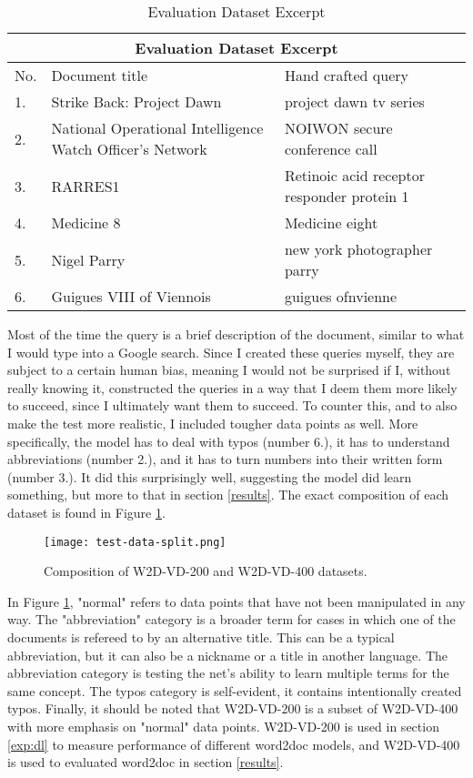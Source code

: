 \begin{table}
  \centering
  \begin{tabular}{|p{1cm}|p{6cm}|p{6cm}|}
    \hline
    \multicolumn{3}{|c|}{Evaluation Dataset Excerpt} \\
    \hline
    No.&Document title&Hand crafted query\\
    \hline
    \hline
    1.&Strike Back: Project Dawn&project dawn tv series\\
    2.&National Operational Intelligence Watch Officer's Network&NOIWON secure conference call\\
    3.&RARRES1&Retinoic acid receptor responder protein 1\\
    4.&Medicine 8&Medicine eight\\
    5.&Nigel Parry&new york photographer parry\\
    6.&Guigues VIII of Viennois&guigues ofnvienne\\
    \hline
  \end{tabular}
  \caption{Evaluation Dataset Excerpt}
  \label{tbl:eval-data}
\end{table}

Most of the time the query is a brief description of the document, similar to what I would type into a Google search. Since I
created these queries myself, they are subject to a certain human bias, meaning I would not be surprised if I, without really
knowing it, constructed the queries in a way that I deem them more likely to succeed, since I ultimately want them to succeed. To
counter this, and to also make the test more realistic, I included tougher data points as well. More specifically, the
model has to deal with typos (number 6.), it has to understand abbreviations (number 2.), and it has to turn numbers into their written
form (number 3.). It did this surprisingly well, suggesting the model did learn something, but more to that in section
\ref{results}. The exact composition of each dataset is found in Figure \ref{fig:dataset-comp}.

\begin{figure}
  \begin{center}
    \texttt{[image: test-data-split.png]}
  \end{center}
  \caption{Composition of W2D-VD-200 and W2D-VD-400 datasets.}
  \label{fig:dataset-comp}
\end{figure}

In Figure \ref{fig:dataset-comp}, "normal" refers to data points that have not been manipulated in any way. The "abbreviation"
category is a broader term for cases in which one of the documents is refereed to by an alternative title. This can be a typical
abbreviation, but it can also be a nickname or a title in another language. The abbreviation category is testing the net's ability
to learn multiple terms for the same concept. The typos category is self-evident, it contains intentionally created typos. Finally,
it should be noted that W2D-VD-200 is a subset of W2D-VD-400 with more emphasis on "normal" data points. W2D-VD-200 is used in
section \ref{exp:dl} to measure performance of different word2doc models, and W2D-VD-400 is used to evaluated word2doc in section
\ref{results}.


